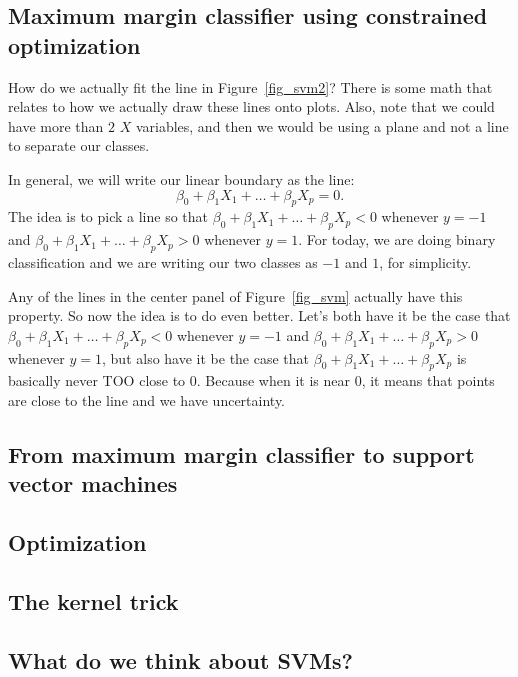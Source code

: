 \subsection{Maximum margin classifier using constrained optimization}

How do we actually fit the line in Figure~\ref{fig_svm2}? There is some math that relates to how we actually draw these lines onto plots. Also, note that we could have more than $2$ $X$ variables, and then we would be using a plane and not a line to separate our classes. 

In general, we will write our linear boundary as the line:
$$
\beta_0 + \beta_1 X_1 + \ldots + \beta_p X_p = 0. 
$$
The idea is to pick a line so that $\beta_0 + \beta_1 X_1 + \ldots + \beta_p X_p < 0$ whenever $y=-1$ and $\beta_0 + \beta_1 X_1 + \ldots + \beta_p X_p > 0$ whenever $y=1$. For today, we are doing binary classification and we are writing our two classes as $-1$ and $1$, for simplicity. 

Any of the lines in the center panel of Figure~\ref{fig_svm} actually have this property. So now the idea is to do even better. Let's both have it be the case that $\beta_0 + \beta_1 X_1 + \ldots + \beta_p X_p < 0$ whenever $y=-1$ and $\beta_0 + \beta_1 X_1 + \ldots + \beta_p X_p > 0$ whenever $y=1$, but also have it be the case that $\beta_0 + \beta_1 X_1 + \ldots + \beta_p X_p$ is basically never TOO close to $0$. Because when it is near $0$, it means that points are close to the line and we have uncertainty. 



\subsection{From maximum margin classifier to support vector machines}



\subsection{Optimization}


\subsection{The kernel trick}


\subsection{What do we think about SVMs?}







